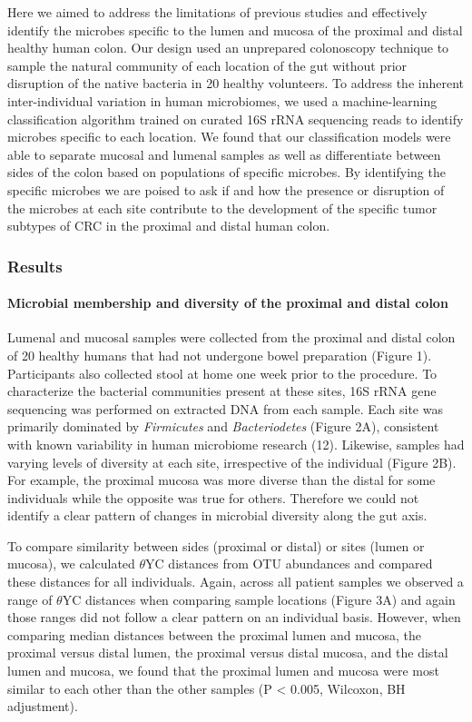 \documentclass[11pt,]{article}
\let\oldparagraph\paragraph
\renewcommand{\paragraph}[1]{\oldparagraph{#1}\mbox{}}
\begin{document}
Here we aimed to address the limitations of previous studies and
effectively identify the microbes specific to the lumen and mucosa of
the proximal and distal healthy human colon. Our design used an
unprepared colonoscopy technique to sample the natural community of each
location of the gut without prior disruption of the native bacteria in
20 healthy volunteers. To address the inherent inter-individual
variation in human microbiomes, we used a machine-learning
classification algorithm trained on curated 16S rRNA sequencing reads to
identify microbes specific to each location. We found that our
classification models were able to separate mucosal and lumenal samples
as well as differentiate between sides of the colon based on populations
of specific microbes. By identifying the specific microbes we are poised
to ask if and how the presence or disruption of the microbes at each
site contribute to the development of the specific tumor subtypes of CRC
in the proximal and distal human colon.

\subsubsection{Results}\label{results}

\paragraph{Microbial membership and diversity of the proximal and distal
colon}\label{microbial-membership-and-diversity-of-the-proximal-and-distal-colon}

Lumenal and mucosal samples were collected from the proximal and distal
colon of 20 healthy humans that had not undergone bowel preparation
(Figure 1). Participants also collected stool at home one week prior to
the procedure. To characterize the bacterial communities present at
these sites, 16S rRNA gene sequencing was performed on extracted DNA
from each sample. Each site was primarily dominated by \emph{Firmicutes}
and \emph{Bacteriodetes} (Figure 2A), consistent with known variability
in human microbiome research (12). Likewise, samples had varying levels
of diversity at each site, irrespective of the individual (Figure 2B).
For example, the proximal mucosa was more diverse than the distal for
some individuals while the opposite was true for others. Therefore we
could not identify a clear pattern of changes in microbial diversity
along the gut axis.

To compare similarity between sides (proximal or distal) or sites (lumen
or mucosa), we calculated \({\theta}\)YC distances from OTU abundances
and compared these distances for all individuals. Again, across all
patient samples we observed a range of \({\theta}\)YC distances when
comparing sample locations (Figure 3A) and again those ranges did not
follow a clear pattern on an individual basis. However, when comparing
median distances between the proximal lumen and mucosa, the proximal
versus distal lumen, the proximal versus distal mucosa, and the distal
lumen and mucosa, we found that the proximal lumen and mucosa were most
similar to each other than the other samples (P \textless{} 0.005,
Wilcoxon, BH adjustment).
\end{document}
